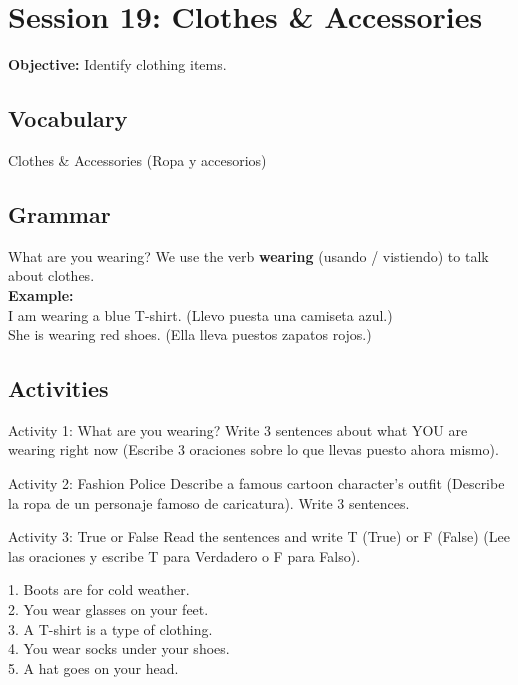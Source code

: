 \section*{Session 19: Clothes \& Accessories}
\textbf{Objective:} Identify clothing items.

\subsection*{Vocabulary}
\begin{vocabcard}{Clothes \& Accessories (Ropa y accesorios)}
\end{vocabcard}

\subsection*{Grammar}
\begin{grammartip}{What are you wearing?}
  We use the verb \textbf{wearing} (usando / vistiendo) to talk about clothes.\\
  \textbf{Example:}\\
  I am wearing a blue T-shirt. (Llevo puesta una camiseta azul.)\\
  She is wearing red shoes. (Ella lleva puestos zapatos rojos.)
\end{grammartip}

\subsection*{Activities}

\begin{activity}{Activity 1: What are you wearing?}
  Write 3 sentences about what YOU are wearing right now (Escribe 3 oraciones sobre lo que llevas puesto ahora mismo).
  \writinglines[3]
\end{activity}

\begin{activity}{Activity 2: Fashion Police }
  Describe a famous cartoon character's outfit (Describe la ropa de un personaje famoso de caricatura). Write 3 sentences.
  \writinglines[3]
\end{activity}

\begin{activity}{Activity 3: True or False }
  Read the sentences and write T (True) or F (False) (Lee las oraciones y escribe T para Verdadero o F para Falso).
  
  1. Boots are for cold weather. \answerline[1cm] \\
  2. You wear glasses on your feet. \answerline[1cm] \\
  3. A T-shirt is a type of clothing. \answerline[1cm] \\
  4. You wear socks under your shoes. \answerline[1cm] \\
  5. A hat goes on your head. \answerline[1cm] 
\end{activity}

